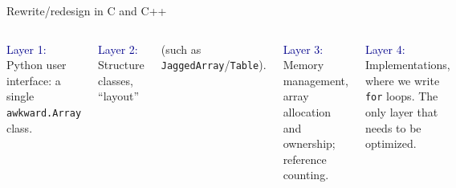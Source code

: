 \documentclass[aspectratio=169]{beamer}
\begin{document}
\begin{frame}{Rewrite/redesign in C and C++}
\large
\vspace{0.5 cm}
\begin{columns}
\vspace{-0.2 cm}

\textcolor{darkblue}{Layer 1:} Python user interface: a single \texttt{awkward.Array} class.
\vspace{\baselineskip}

\vspace{0.18 cm}
\textcolor{darkblue}{Layer 2:} Structure classes, ``layout''

(such as \texttt{JaggedArray}/\texttt{Table}).
\vspace{\baselineskip}

\vspace{0.18 cm}
\textcolor{darkblue}{Layer 3:} Memory management, array allocation and ownership; reference counting.
\vspace{\baselineskip}

\vspace{0.18 cm}
\textcolor{darkblue}{Layer 4:} Implementations, where we write \texttt{for} loops. The only layer that needs to be optimized.

\includegraphics[width=\linewidth]{awkward-1-0-layers.pdf}
\end{columns}
\end{frame}
\end{document}
